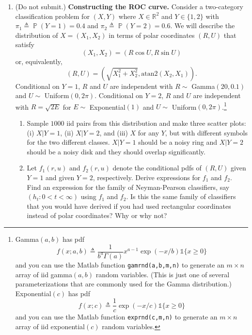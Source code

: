 \documentclass[11pt]{report}
\DeclareMathOperator{\Prob}{\mathbb{P}}
\newcommand{\ind}{{\mathds{1}}}
\newcommand{\teq}{\triangleq}
\begin{document}
\begin{enumerate}[1.]
	      {\em Remark}: Preprocessing, i.e., finding good features, is often crucial for real-world classification, even though you just showed that it can only hurt optimal performance. The reason is that in most practical situations we do not know the underlying distributions and, consequently, we cannot do optimal classification. Preprocessing can make it easier for a statistical procedure to learn a good classifier, even though the classifier may not be optimal.


	      \pagebreak


	\item {\color{blue} (Do not submit.)} {\bf Constructing the ROC curve.} Consider a two-category classification problem for $(X,Y)$ where $X\in\mathbb{R}^2$ and $Y\in\{1,2\}$ with $\pi_1\teq\Prob(Y=1)=0.4$ and $\pi_2\teq\Prob(Y=2)=0.6$.  We will describe the distribution of $X=(X_1,X_2)$ in terms of polar coordinates $(R,U)$ that satisfy
	      \[ (X_1,X_2) = (R\cos U,R\sin U) \]
	      or, equivalently,  \[ (R,U) = (\sqrt{X_1^2+X_2^2}, \text{atan2}(X_2,X_1)) . \]
	      Conditional on $Y=1$, $R$ and $U$ are independent with $R\sim $ Gamma$(20,0.1)$ and $U\sim $ Uniform$(0,2\pi)$.  Conditional on $Y=2$, $R$ and $U$ are independent with $R=\sqrt{2E}$ for $E\sim $ Exponential$(1)$ and \newline
	      $U\sim $ Uniform$(0,2\pi)$.\footnote{Gamma$(a,b)$ has pdf
	      \[ f(x;a,b) \teq \frac{1}{b^a\Gamma(a)}x^{a-1}\exp(-x/b)\ind\{x\geq 0\}
	      \]
	      and you can use the Matlab function {\tt gamrnd(a,b,m,n)} to generate an $m\times n$ array of iid gamma$(a,b)$ random variables.
	      (This is just one of several parameterizations that are commonly used for the Gamma distribution.)
	      Exponential$(c)$ has pdf
	      \[ f(x;c) \teq \frac{1}{c}\exp(-x/c)\ind\{x\geq 0\}
	      \]
	      and you can use the Matlab function {\tt exprnd(c,m,n)} to generate an $m\times n$ array of iid exponential$(c)$ random variables.}
	      \begin{enumerate}
		      \item Sample $1000$ iid pairs from this distribution and make three scatter plots: (i) $X|Y=1$, (ii) $X|Y=2$, and (iii) $X$ for any $Y$, but with different symbols for the two different classes.  $X|Y=1$ should be a noisy ring and $X|Y=2$ should be a noisy disk and they should overlap significantly.
		      \item Let $f_1(r,u)$ and $f_2(r,u)$ denote the conditional pdfs of $(R,U)$ given $Y=1$ and given $Y=2$, respectively.  Derive expressions for $f_1$ and $f_2$.  Find an expression for the family of Neyman-Pearson classifiers, say $(h_t : 0 < t < \infty)$ using $f_1$ and $f_2$.  Is this the same family of classifiers that you would have derived if you had used rectangular coordinates instead of polar coordinates?  Why or why not?

\end{enumerate}
\end{enumerate}
\end{document}
